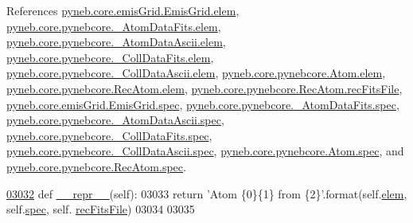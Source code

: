 References \hyperlink{emis_grid_8py_source_l00045}{pyneb.\+core.\+emis\+Grid.\+Emis\+Grid.\+elem}, \hyperlink{pynebcore_8py_source_l00083}{pyneb.\+core.\+pynebcore.\+\_\+\+Atom\+Data\+Fits.\+elem}, \hyperlink{pynebcore_8py_source_l00304}{pyneb.\+core.\+pynebcore.\+\_\+\+Atom\+Data\+Ascii.\+elem}, \hyperlink{pynebcore_8py_source_l00560}{pyneb.\+core.\+pynebcore.\+\_\+\+Coll\+Data\+Fits.\+elem}, \hyperlink{pynebcore_8py_source_l00910}{pyneb.\+core.\+pynebcore.\+\_\+\+Coll\+Data\+Ascii.\+elem}, \hyperlink{pynebcore_8py_source_l01165}{pyneb.\+core.\+pynebcore.\+Atom.\+elem}, \hyperlink{pynebcore_8py_source_l02565}{pyneb.\+core.\+pynebcore.\+Rec\+Atom.\+elem}, \hyperlink{pynebcore_8py_source_l02644}{pyneb.\+core.\+pynebcore.\+Rec\+Atom.\+rec\+Fits\+File}, \hyperlink{emis_grid_8py_source_l00046}{pyneb.\+core.\+emis\+Grid.\+Emis\+Grid.\+spec}, \hyperlink{pynebcore_8py_source_l00084}{pyneb.\+core.\+pynebcore.\+\_\+\+Atom\+Data\+Fits.\+spec}, \hyperlink{pynebcore_8py_source_l00305}{pyneb.\+core.\+pynebcore.\+\_\+\+Atom\+Data\+Ascii.\+spec}, \hyperlink{pynebcore_8py_source_l00561}{pyneb.\+core.\+pynebcore.\+\_\+\+Coll\+Data\+Fits.\+spec}, \hyperlink{pynebcore_8py_source_l00911}{pyneb.\+core.\+pynebcore.\+\_\+\+Coll\+Data\+Ascii.\+spec}, \hyperlink{pynebcore_8py_source_l01166}{pyneb.\+core.\+pynebcore.\+Atom.\+spec}, and \hyperlink{pynebcore_8py_source_l02566}{pyneb.\+core.\+pynebcore.\+Rec\+Atom.\+spec}.


\begin{DoxyCode}
\hypertarget{classpyneb_1_1core_1_1pynebcore_1_1_rec_atom_l03032}{}\hyperlink{classpyneb_1_1core_1_1pynebcore_1_1_rec_atom_a7bed1e9b39a55269b74b2aeb455b819c}{03032}     \textcolor{keyword}{def }\hyperlink{classpyneb_1_1core_1_1pynebcore_1_1_rec_atom_a7bed1e9b39a55269b74b2aeb455b819c}{\_\_repr\_\_}(self):
03033         \textcolor{keywordflow}{return} \textcolor{stringliteral}{'Atom \{0\}\{1\} from \{2\}'}.format(self.\hyperlink{classpyneb_1_1core_1_1pynebcore_1_1_rec_atom_a1325fff2854658752d522c7284df5a8a}{elem}, self.\hyperlink{classpyneb_1_1core_1_1pynebcore_1_1_rec_atom_ac2485287f7694915959ba49b9b82e483}{spec}, self.
      \hyperlink{classpyneb_1_1core_1_1pynebcore_1_1_rec_atom_a2108a27da329b8599357e990a446faae}{recFitsFile})
03034         
03035 
\end{DoxyCode}
\hypertarget{classpyneb_1_1core_1_1pynebcore_1_1_rec_atom_adcc9c72bd96e9064b01591d8b32112ea}{}
